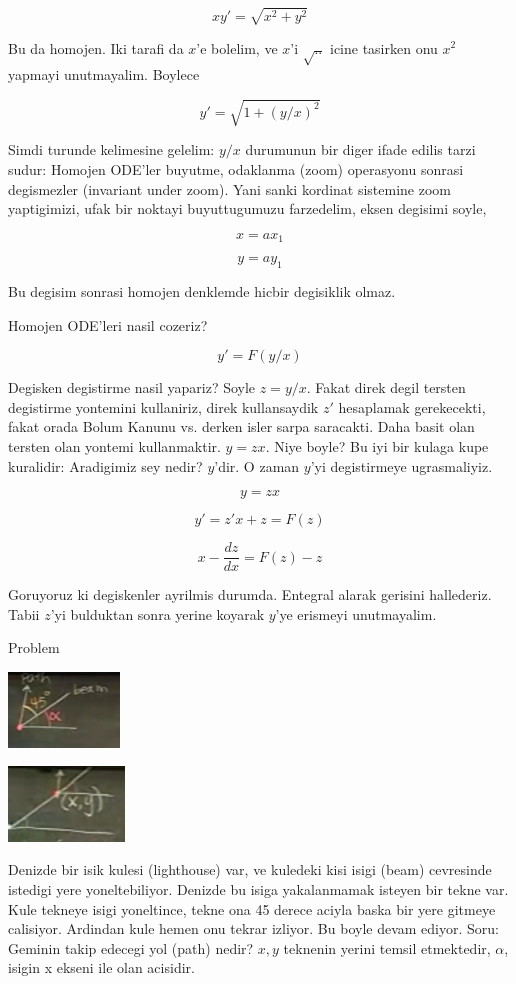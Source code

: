 \documentclass[12pt,fleqn]{article}
\begin{document}
\[ xy' = \sqrt{x^2 + y^2} \]

Bu da homojen. Iki tarafi da $x$'e bolelim, ve $x$'i $\sqrt{..}$ icine
tasirken onu $x^2$ yapmayi unutmayalim. Boylece

\[ y' = \sqrt{1+(y/x)^2} \]

Simdi turunde kelimesine gelelim: $y/x$ durumunun bir diger ifade
edilis tarzi sudur: Homojen ODE'ler buyutme, odaklanma (zoom)
operasyonu sonrasi degismezler (invariant under zoom). Yani sanki
kordinat sistemine zoom yaptigimizi, ufak bir noktayi buyuttugumuzu
farzedelim, eksen degisimi soyle,

\[ x = ax_1 \]

\[ y = ay_1 \]

Bu degisim sonrasi homojen denklemde hicbir degisiklik olmaz. 

Homojen ODE'leri nasil cozeriz?

\[ y' = F(y/x) \]

Degisken degistirme nasil yapariz? Soyle $z = y/x$. Fakat direk degil
tersten degistirme yontemini kullaniriz, direk kullansaydik $z'$
hesaplamak gerekecekti, fakat orada Bolum Kanunu vs. derken isler
sarpa saracakti. Daha basit olan tersten olan yontemi kullanmaktir. 
$y
= zx$. Niye boyle? Bu iyi bir kulaga kupe kuralidir: Aradigimiz sey
nedir? $y$'dir. O zaman $y$'yi degistirmeye ugrasmaliyiz.

\[ y = zx \]

\[ y' = z'x + z = F(z)\]

\[ x - \frac{dz}{dx} = F(z) - z \]

Goruyoruz ki degiskenler ayrilmis durumda. Entegral alarak gerisini
hallederiz. Tabii $z$'yi bulduktan sonra yerine koyarak $y$'ye
erismeyi unutmayalim. 

Problem

\includegraphics[height=2cm]{4_1.png}

\includegraphics[height=2cm]{4_2.png}

Denizde bir isik kulesi (lighthouse) var, ve kuledeki kisi isigi
(beam) cevresinde istedigi yere yoneltebiliyor. Denizde bu isiga
yakalanmamak isteyen bir tekne var. Kule tekneye isigi yoneltince,
tekne ona 45 derece aciyla baska bir yere gitmeye calisiyor. Ardindan
kule hemen onu tekrar izliyor. Bu boyle devam ediyor. Soru: Geminin
takip edecegi yol (path) nedir? $x,y$ teknenin yerini temsil
etmektedir, $\alpha$, isigin x ekseni ile olan acisidir. 
\end{document}
